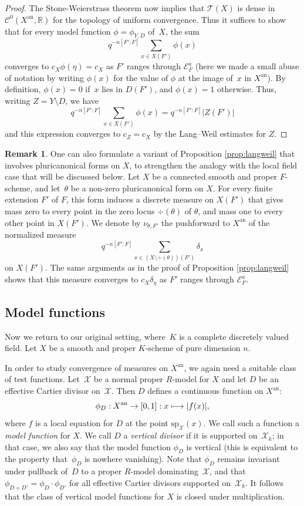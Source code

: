 \documentclass[JEP,XML,SOM,Unicode,NoFloatCountersInSection]{cedram}
\let\mathcal\mathscr
\newcommand{\mto}{\mathchoice{\longmapsto}{\mapsto}{\mapsto}{\mapsto}}
\theoremstyle{definition}
\newtheorem{remark}[equation]{Remark}
\numberwithin{equation}{subsection}
\newcommand{\R}{\ensuremath{\mathbb{R}}}
\newcommand{\cX}{\ensuremath{\mathscr{X}}}
\newcommand{\an}{\mathrm{an}}
\newcommand{\spe}{\mathrm{sp}}
\let\form\theta
\begin{document}
\begin{proof}
The Stone-Weierstrass theorem now implies that $\mathcal{T}(X)$ is dense in
$\mathcal{C}^0(X^{\an},\R)$ for the topology of uniform convergence. Thus it suffices to show that for every model function $\phi=\phi_{Y,D}$ of~$X$, the sum
\[
q^{-n[F'\colon F]}\sum_{x\in X(F')}\phi(x)
\]
converges to $c_X\phi(\eta)=c_X$
as $F'$ ranges through $\mathcal{E}^a_F$ (here we made a small abuse of notation by writing $\phi(x)$ for the value of $\phi$ at the image of~$x$ in $X^{\an}$).
By definition, $\phi(x)=0$ if~$x$ lies in $D(F')$, and $\phi(x)=1$ otherwise.
Thus, writing $Z=Y\setminus D$, we have
\[
q^{-n[F'\colon F]}\sum_{x\in X(F')}\phi(x)=q^{-n[F'\colon F]}|Z(F')|
\]
and this expression converges to $c_Z=c_X$ by the Lang--Weil estimates for $Z$.
\end{proof}

\begin{remark}
One can also formulate a variant of Proposition \ref{prop:langweil} that involves pluricanonical forms on $X$, to strengthen the analogy with the local field case that will be discussed below. Let $X$ be a connected smooth and proper $F$-scheme, and let~$\form$ be a non-zero pluricanonical form on $X$. For every finite extension $F'$ of $F$, this form induces a discrete measure on $X(F')$ that gives mass zero to every point in the zero locus $\div(\form)$ of $\form$, and mass one to every other point in $X(F')$.
We denote by $\nu_{\form,F'}$
the pushforward to $X^{\an}$ of the normalized measure
\[
q^{-n[F'\colon F]}\sum_{x\in (X\setminus \div(\form))(F')}\delta_x
\]
on $X(F')$.
The same arguments as in the proof of Proposition \ref{prop:langweil} shows that this measure converges to $c_X\delta_{\eta}$ as $F'$ ranges through $\mathcal{E}_F^a$.
\end{remark}

\subsection{Model functions}
Now we return to our original setting, where~$K$ is a complete discretely valued field.
Let $X$ be a smooth and proper $K$\nobreakdash-scheme of pure dimension $n$.

In order to study convergence of measures on $X^{\an}$, we again need a suitable class of test functions.
Let~$\cX$ be a normal proper $R$\nobreakdash-model for $X$ and let $D$ be an effective Cartier divisor on~$\cX$. Then $D$ defines a continuous function on $X^{\an}$:
\[
\phi_D:X^{\an}\to [0,1]:x\mto |f(x)|,
\]
where $f$ is a local equation for $D$ at the point $\spe_{\cX}(x)$. We call such a function a {\em model function} for $X$.
We call $D$ a {\em vertical divisor} if it is supported on~$\cX_k$;
in that case, we also say that the model function $\phi_D$ is vertical (this is equivalent to the property that~$\phi_D$ is nowhere vanishing).
Note that $\phi_D$ remains invariant under pullback of~$D$ to a proper $R$\nobreakdash-model dominating~$\cX$, and that $\phi_{D+D'}=\phi_D\cdot \phi_{D'}$ for all
effective Cartier divisors supported on~$\cX_k$. It follows that the class of vertical model functions for $X$ is closed under multiplication.
\end{document}
